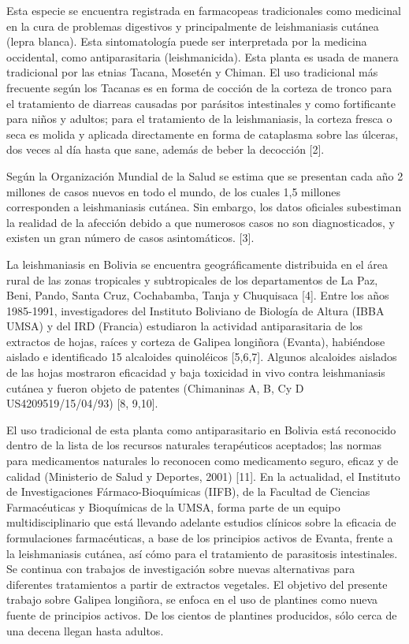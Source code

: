 \documentclass{article}
\begin{document}
Esta especie se encuentra registrada en farmacopeas tradicionales como medicinal
en la cura de problemas digestivos y principalmente de leishmaniasis cutánea
(lepra blanca). Esta sintomatología puede ser interpretada por la medicina
occidental, como antiparasitaria (leishmanicida). Esta planta es usada de manera
tradicional por las etnias Tacana, Mosetén y Chiman. El uso tradicional más
frecuente según los Tacanas es en forma de cocción de la corteza de tronco para
el tratamiento de diarreas causadas por parásitos intestinales y como
fortificante para niños y adultos; para el tratamiento de la leishmaniasis, la
corteza fresca o seca es molida y aplicada directamente en forma de cataplasma
sobre las úlceras, dos veces al día hasta que sane, además de beber la decocción
[2].

Según la Organización Mundial de la Salud se estima que se presentan cada año 2
millones de casos nuevos en todo el mundo, de los cuales 1,5 millones
corresponden a leishmaniasis cutánea. Sin embargo, los datos oficiales
subestiman la realidad de la afección debido a que numerosos casos no son
diagnosticados, y existen un gran número de casos asintomáticos. [3].

La leishmaniasis en Bolivia se encuentra geográficamente distribuida en el área
rural de las zonas tropicales y subtropicales de los departamentos de La Paz,
Beni, Pando, Santa Cruz, Cochabamba, Tanja y Chuquisaca [4]. Entre los años
1985-1991, investigadores del Instituto Boliviano de Biología de Altura (IBBA
UMSA) y del IRD (Francia) estudiaron la actividad antiparasitaria de los
extractos de hojas, raíces y corteza de Galipea longiñora (Evanta), habiéndose
aislado e identificado 15 alcaloides quinoléicos [5,6,7]. Algunos alcaloides
aislados de las hojas mostraron eficacidad y baja toxicidad in vivo contra
leishmaniasis cutánea y fueron objeto de patentes (Chimaninas A, B, Cy D
US4209519/15/04/93) [8, 9,10].

El uso tradicional de esta planta como antiparasitario en Bolivia está
reconocido dentro de la lista de los recursos naturales terapéuticos aceptados;
las normas para medicamentos naturales lo reconocen como medicamento seguro,
eficaz y de calidad (Ministerio de Salud y Deportes, 2001) [11]. En la
actualidad, el Instituto de Investigaciones Fármaco-Bioquímicas (IIFB), de la
Facultad de Ciencias Farmacéuticas y Bioquímicas de la UMSA, forma parte de un
equipo multidisciplinario que está llevando adelante estudios clínicos sobre la
eficacia de formulaciones farmacéuticas, a base de los principios activos de
Evanta, frente a la leishmaniasis cutánea, así cómo para el tratamiento de
parasitosis intestinales. Se continua con trabajos de investigación sobre nuevas
alternativas para diferentes tratamientos a partir de extractos vegetales. El
objetivo del presente trabajo sobre Galipea longiñora, se enfoca en el uso de
plantines como nueva fuente de principios activos. De los cientos de plantines
producidos, sólo cerca de una decena llegan hasta adultos.
\end{document}
